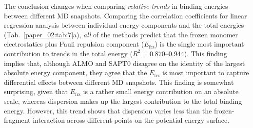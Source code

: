 \documentclass[%
  class = book,%
  crop = false,%
  float = true,%
  multi = true,%
  preview = false,%
]{standalone}
\begin{document}
The conclusion changes when comparing \emph{relative trends} in binding energies between different MD snapshots. Comparing the correlation coefficients for linear regression analysis between individual energy components and the total energies (Tab.~\ref{paper_02:tab:7}a), \emph{all} of the methods predict that the frozen monomer electrostatics plus Pauli repulsion component (\(E_{\text{frz}}\)) is the single most important contribution to trends in the total energy (\(R^2 = \numrange[range-phrase = --]{0.870}{0.944}\)). This finding implies that, although ALMO and SAPT0 disagree on the identity of the largest absolute energy component, they agree that the \(E_{\text{frz}}\) is most important to capture differential effects between different MD snapshots. This finding is somewhat surprising, given that \(E_{\text{frz}}\) is a rather small energy contribution on an absolute scale, whereas dispersion makes up the largest contribution to the total binding energy. However, this trend shows that dispersion varies less than the frozen-fragment interaction across different points on the potential energy surface.
\end{document}
